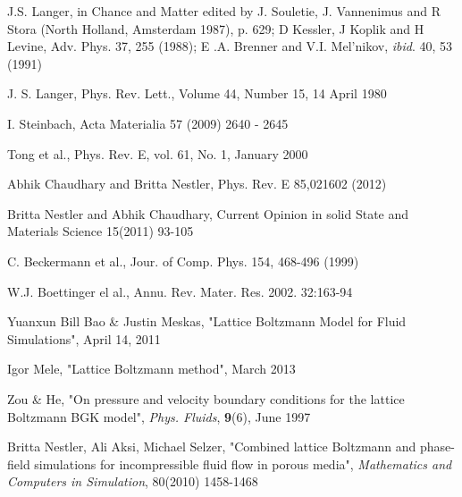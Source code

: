 \documentclass[12pt,a4paper]{report}
\begin{document}
\begin{thebibliography}{1}
	
   J.S. Langer, in Chance and Matter edited by J. Souletie, J. Vannenimus 
	and R Stora (North Holland, Amsterdam 1987), p. 629; D Kessler, J Koplik and H Levine, Adv. 
	Phys. 37, 255 (1988); E .A. Brenner and V.I. Mel'nikov, \textit{ibid}. 40, 53 (1991)
	
   J. S. Langer, Phys. Rev. Lett., Volume 44, Number 15, 14 April 1980 

   I. Steinbach, Acta Materialia 57 (2009) 2640 - 2645

   Tong et al., Phys. Rev. E, vol. 61, No. 1, January 2000

   Abhik Chaudhary and Britta Nestler, Phys. Rev. E 85,021602 (2012)
  
   Britta Nestler and Abhik Chaudhary, Current Opinion in solid State 
  and Materials Science 15(2011) 93-105
  
   C. Beckermann et al., Jour. of Comp. Phys. 154, 468-496 (1999)
  
   W.J. Boettinger el al., Annu. Rev. Mater. Res. 2002. 32:163-94
  
   Yuanxun Bill Bao \& Justin Meskas, "Lattice Boltzmann Model for Fluid Simulations", April 14, 2011
  
   Igor Mele, "Lattice Boltzmann method", March 2013 
  
   Zou \& He, "On pressure and velocity boundary conditions for the lattice Boltzmann BGK model", {\em Phys. Fluids}, {\bf 9}(6), June 1997 
  
   Britta Nestler, Ali Aksi, Michael Selzer, "Combined lattice Boltzmann and phase-field simulations for incompressible fluid flow in porous media", {\em Mathematics and Computers in Simulation}, 80(2010) 1458-1468
	
\end{thebibliography}
\end{document}
